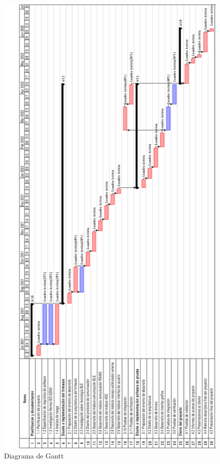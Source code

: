 \documentclass[
11pt, %
codirector, %
]{charter}
\begin{document}
\begin{figure}[htpb]
\centering 
\includegraphics[height=.96\textheight]{./Figuras/DASNGantt.png}
\caption{Diagrama de Gantt}
\label{fig:diagGantt}
\end{figure}
\end{document}
